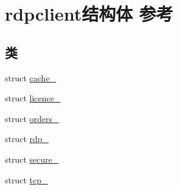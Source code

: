 \hypertarget{structrdpclient}{}\section{rdpclient结构体 参考}
\label{structrdpclient}
\subsection*{类}
\begin{DoxyCompactItemize}
\item 
struct \hyperlink{structrdpclient_1_1cache__}{cache\+\_\+}
\item 
struct \hyperlink{structrdpclient_1_1licence__}{licence\+\_\+}
\item 
struct \hyperlink{structrdpclient_1_1orders__}{orders\+\_\+}
\item 
struct \hyperlink{structrdpclient_1_1rdp__}{rdp\+\_\+}
\item 
struct \hyperlink{structrdpclient_1_1secure__}{secure\+\_\+}
\item 
struct \hyperlink{structrdpclient_1_1tcp__}{tcp\+\_\+}
\end{DoxyCompactItemize}
